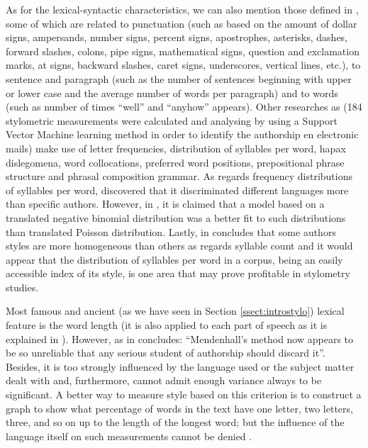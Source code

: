 As for the lexical-syntactic characteristics, we can also mention those defined in \cite{calix2008stylometry}, some of which are related to punctuation (such as based on the amount of dollar signs, ampersands, number signs, percent signs, apostrophes, asterisks, dashes, forward slashes, colons, pipe signs, mathematical signs, question and exclamation marks, at signs, backward slashes, caret signs, underscores, vertical lines, etc.), to sentence and paragraph (such as the number of sentences beginning with upper or lower case and the average number of words per paragraph) and to words (such as number of times ``well'' and ``anyhow'' appears). Other researches as \cite{corney2001identifying} (184 stylometric measurements were calculated and analysing by using a Support Vector Machine learning method in order to identify the authorship en electronic mails) make use of letter frequencies, distribution of syllables per word, hapax dislegomena, word collocations, preferred word positions, prepositional phrase structure and phrasal composition grammar. As regards frequency distributions of syllables per word, \cite{fucks1965mathematische} discovered that it discriminated different languages more than specific authors. However, in \cite{brainerd1974weighting}, it is claimed that a model based on a translated negative binomial distribution was a better fit to such distributions than \cite{fucks1965mathematische} translated Poisson distribution. Lastly, in \cite{brainerd1974weighting} concludes that some authors styles are more homogeneous than others as regards syllable count and it would appear that the distribution of syllables per word in a corpus, being an easily accessible index of its style, is one area that may prove profitable in stylometry studies.

Most famous and ancient (as we have seen in Section \ref{ssect:introstylo}) lexical feature is the word length (it is also applied to each part of speech as it is explained in \cite{allen1974methods}). However, as in \cite{smith1983recent} concludes: ``Mendenhall's method now appears to be so unreliable that any serious student of authorship should discard it''. Besides, it is too strongly influenced by the language used or the subject matter dealt with and, furthermore, cannot admit enough variance always to be significant. A better way to measure style based on this criterion is to construct a graph to show what percentage of words in the text have one letter, two letters, three, and so on up to the length of the longest word; but the influence of the language itself on such measurements cannot be denied \citep{williams1970style}.

